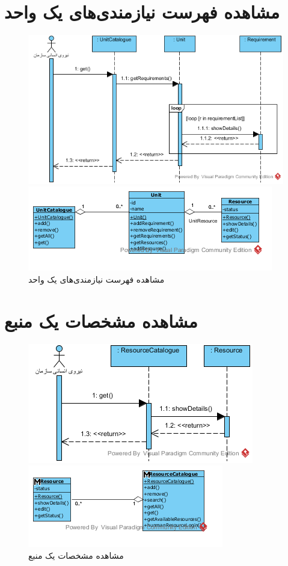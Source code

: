 \section{مشاهده فهرست نیازمندی‌های یک واحد}
\begin{figure}[H]
	\centering
	\includegraphics[scale=0.7]{img/sequence-analysis/ViewListOfRequirements}
	
	
	\includegraphics[scale=0.7]{img/sequence-analysis/ViewListOfRequirementsC}
	\caption{مشاهده فهرست نیازمندی‌های یک واحد}
\end{figure}


\section{مشاهده مشخصات یک منبع}
\begin{figure}[H]
	\centering
	\includegraphics[scale=1]{img/sequence-analysis/ViewResourceAttributes}
	
	
	\includegraphics[scale=1]{img/sequence-analysis/ViewResourceAttributesC}
	\caption{مشاهده مشخصات یک منبع}
\end{figure}

